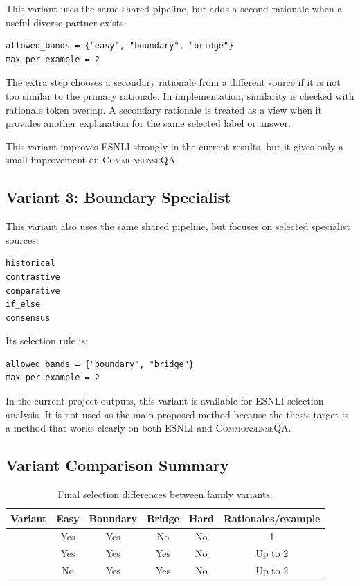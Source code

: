 \documentclass[11pt]{article}
\DeclareRobustCommand{\code}[1]{\texttt{\detokenize{#1}}}
\newcommand{\dataset}[1]{\textsc{#1}}
\begin{document}
This variant uses the same shared pipeline, but adds a second rationale when a useful diverse partner exists:

\begin{lstlisting}
allowed_bands = {"easy", "boundary", "bridge"}
max_per_example = 2
\end{lstlisting}

The extra step chooses a secondary rationale from a different source if it is not too similar to the primary rationale. In implementation, similarity is checked with rationale token overlap. A secondary rationale is treated as a \code{bridge} view when it provides another explanation for the same selected label or answer.

This variant improves \dataset{ESNLI} strongly in the current results, but it gives only a small improvement on \dataset{CommonsenseQA}.

\subsection{Variant 3: Boundary Specialist}

This variant also uses the same shared pipeline, but focuses on selected specialist sources:

\begin{lstlisting}
historical
contrastive
comparative
if_else
consensus
\end{lstlisting}

Its selection rule is:

\begin{lstlisting}
allowed_bands = {"boundary", "bridge"}
max_per_example = 2
\end{lstlisting}

In the current project outputs, this variant is available for \dataset{ESNLI} selection analysis. It is not used as the main proposed method because the thesis target is a method that works clearly on both \dataset{ESNLI} and \dataset{CommonsenseQA}.

\subsection{Variant Comparison Summary}

\begin{table}[H]
\centering
\caption{Final selection differences between family variants.}
\begin{tabular}{lccccc}
\toprule
Variant & Easy & Boundary & Bridge & Hard & Rationales/example \\
\midrule
\code{boundary_mix} & Yes & Yes & No & No & 1 \\
\code{boundary_bridge} & Yes & Yes & Yes & No & Up to 2 \\
\code{boundary_specialist} & No & Yes & Yes & No & Up to 2 \\
\bottomrule
\end{tabular}
\end{table}
\end{document}
